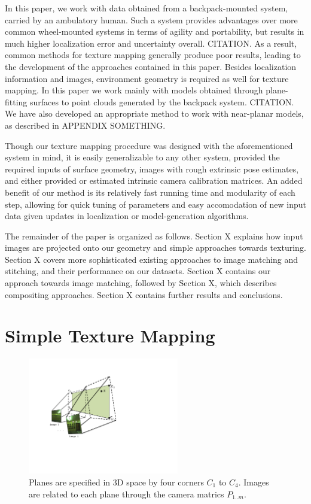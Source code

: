 \documentclass[]{spie}  %
\begin{document}
In this paper, we work with data obtained from a backpack-mounted
system, carried by an ambulatory human. Such a system provides
advantages over more common wheel-mounted systems in terms of agility
and portability, but results in much higher localization error and
uncertainty overall. CITATION. As a result, common methods for texture
mapping generally produce poor results, leading to the development of
the approaches contained in this paper. Besides localization
information and images, environment geometry is required as well for
texture mapping. In this paper we work mainly with models obtained
through plane-fitting surfaces to point clouds generated by the
backpack system. CITATION. We have also developed an appropriate
method to work with near-planar models, as described in APPENDIX
SOMETHING.

Though our texture mapping procedure was designed with the
aforementioned system in mind, it is easily generalizable to any other
system, provided the required inputs of surface geometry, images with
rough extrinsic pose estimates, and either provided or estimated
intrinsic camera calibration matrices. An added benefit of our method
is its relatively fast running time and modularity of each step,
allowing for quick tuning of parameters and easy accomodation of new
input data given updates in localization or model-generation
algorithms.

The remainder of the paper is organized as follows. Section X explains
how input images are projected onto our geometry and simple approaches
towards texturing. Section X covers more sophisticated existing
approaches to image matching and stitching, and their performance on
our datasets. Section X contains our approach towards image matching,
followed by Section X, which describes compositing approaches. Section
X contains further results and conclusions.

\section{Simple Texture Mapping}
\label{sec:simpleTextureMapping}
\begin{figure}
  \centering
  \includegraphics[height=2in]{Projection.pdf}
  \caption{Planes are specified in 3D space by four corners $C_1$ to
    $C_4$. Images are related to each plane through the camera matrics
    $P_{1..m}$. }
  \label{fig:projection}
\end{figure}
\end{document}
